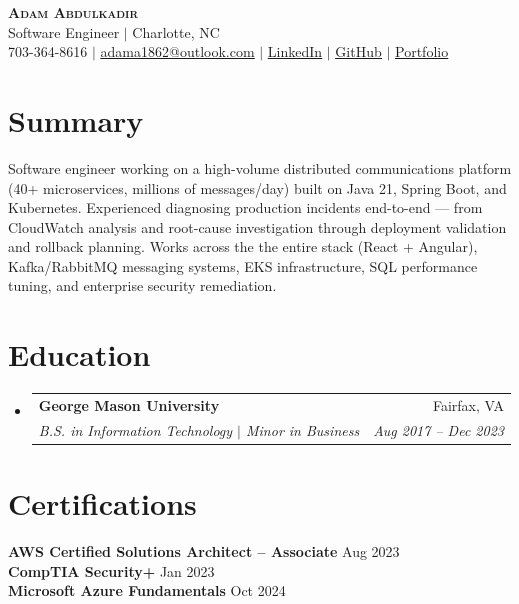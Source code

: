 \documentclass[letterpaper,12pt]{article}
\makeatletter
\newcommand{\resumeSubheading}[4]{
  \needspace{6\baselineskip}%
  \vspace{-2pt}\item
    \begin{tabular*}{0.97\textwidth}[t]{l@{\extracolsep{\fill}}r}
      \textbf{#1} & #2 \\
      \textit{\small#3} & \textit{\small #4} \\
    \end{tabular*}\vspace{-7pt}
}
\newcommand{\resumeSubHeadingListStart}{\begin{itemize}[leftmargin=0.15in, label={}]}
\newcommand{\resumeSubHeadingListEnd}{\end{itemize}}
\makeatother
\begin{document}
\begin{center}
    \textbf{\Huge \scshape Adam Abdulkadir} \\ \vspace{4pt}
    \small Software Engineer $|$ Charlotte, NC \\ \vspace{4pt}
    \small 703-364-8616 $|$
    \href{mailto:adama1862@outlook.com}{\underline{adama1862@outlook.com}} $|$
    \href{https://linkedin.com/in/adam-abdulkadir}{\underline{LinkedIn}} $|$
    \href{https://github.com/aabdulk862}{\underline{GitHub}} $|$
    \href{https://adam-abdul.com/}{\underline{Portfolio}}
\end{center}

\section{Summary}
\small{Software engineer working on a high-volume distributed communications platform (40+ microservices, millions of messages/day) built on Java 21, Spring Boot, and Kubernetes. Experienced diagnosing production incidents end-to-end — from CloudWatch analysis and root-cause investigation through deployment validation and rollback planning. Works across the the entire stack (React + Angular), Kafka/RabbitMQ messaging systems, EKS infrastructure, SQL performance tuning, and enterprise security remediation.}

\section{Education}
  \resumeSubHeadingListStart
    \resumeSubheading
      {George Mason University}{Fairfax, VA}
      {B.S. in Information Technology \textnormal{$|$} Minor in Business}{Aug 2017 -- Dec 2023}
  \resumeSubHeadingListEnd

\section{Certifications}
\begin{itemize}[leftmargin=0.15in, label={}]
    \small{\item{
        \textbf{AWS Certified Solutions Architect -- Associate} \hfill Aug 2023 \\
        \textbf{CompTIA Security+} \hfill Jan 2023 \\
        \textbf{Microsoft Azure Fundamentals} \hfill Oct 2024
    }}
\end{itemize}
\end{document}

